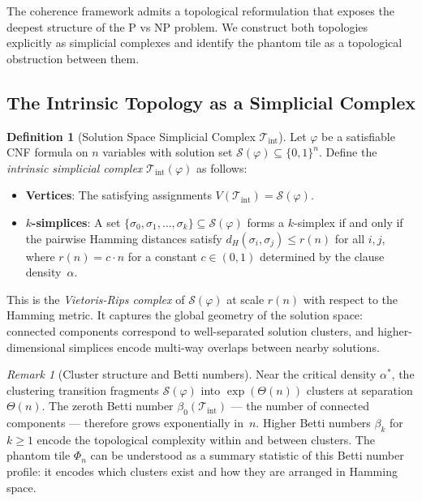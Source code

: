 \documentclass[11pt]{article}
\theoremstyle{definition}
\newtheorem{definition}[theorem]{Definition}
\theoremstyle{remark}
\newtheorem{remark}[theorem]{Remark}
\newcommand{\calS}{\mathcal{S}}
\begin{document}
The coherence framework admits a topological reformulation that
exposes the deepest structure of the P vs NP problem.  We construct
both topologies explicitly as simplicial complexes and identify the
phantom tile as a topological obstruction between them.

\subsection{The Intrinsic Topology as a Simplicial Complex}

\begin{definition}[Solution Space Simplicial Complex $\mathcal{T}_{\mathrm{int}}$]
\label{def:pnp-topo-int}
Let $\varphi$ be a satisfiable CNF formula on $n$ variables with
solution set $\calS(\varphi) \subseteq \{0,1\}^n$.  Define the
\emph{intrinsic simplicial complex} $\mathcal{T}_{\mathrm{int}}(\varphi)$
as follows:
\begin{itemize}[nosep]
  \item \textbf{Vertices}: The satisfying assignments
    $V(\mathcal{T}_{\mathrm{int}}) = \calS(\varphi)$.
  \item \textbf{$k$-simplices}: A set $\{\sigma_0, \sigma_1, \ldots, \sigma_k\}
    \subseteq \calS(\varphi)$ forms a $k$-simplex if and only if the
    pairwise Hamming distances satisfy $d_H(\sigma_i, \sigma_j) \leq r(n)$
    for all $i, j$, where $r(n) = c \cdot n$ for a constant
    $c \in (0, 1)$ determined by the clause density~$\alpha$.
\end{itemize}
This is the \emph{Vietoris-Rips complex} of $\calS(\varphi)$ at scale
$r(n)$ with respect to the Hamming metric.  It captures the global
geometry of the solution space: connected components correspond to
well-separated solution clusters, and higher-dimensional simplices
encode multi-way overlaps between nearby solutions.
\end{definition}

\begin{remark}[Cluster structure and Betti numbers]
\label{rem:betti}
Near the critical density $\alpha^*$, the clustering transition fragments
$\calS(\varphi)$ into $\exp(\Theta(n))$ clusters at separation
$\Theta(n)$.  The zeroth Betti number $\beta_0(\mathcal{T}_{\mathrm{int}})$
--- the number of connected components --- therefore grows exponentially
in~$n$.  Higher Betti numbers $\beta_k$ for $k \geq 1$ encode the
topological complexity within and between clusters.  The phantom tile
$\Phi_n$ can be understood as a summary statistic of this Betti number
profile: it encodes which clusters exist and how they are arranged in
Hamming space.
\end{remark}
\end{document}
